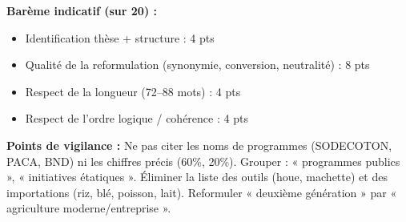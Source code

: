 \documentclass[11pt]{article}
\begin{document}
\begin{corrige}
\textbf{Barème indicatif (sur 20) :}
\begin{itemize}
    \item Identification thèse + structure : 4 pts
    \item Qualité de la reformulation (synonymie, conversion, neutralité) : 8 pts
    \item Respect de la longueur (72--88 mots) : 4 pts
    \item Respect de l'ordre logique / cohérence : 4 pts
\end{itemize}
\textbf{Points de vigilance :} Ne pas citer les noms de programmes (SODECOTON, PACA, BND) ni les chiffres précis (60\%, 20\%). Grouper : « programmes publics », « initiatives étatiques ». Éliminer la liste des outils (houe, machette) et des importations (riz, blé, poisson, lait). Reformuler « deuxième génération » par « agriculture moderne/entreprise ».


\end{corrige}
\end{document}
